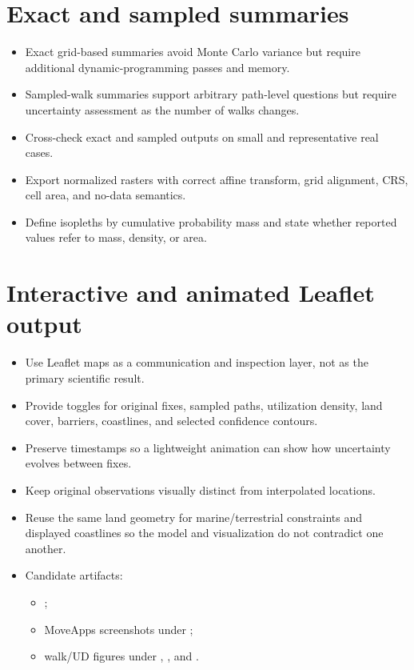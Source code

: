 \section{Exact and sampled summaries}

\begin{itemize}
  \item Exact grid-based summaries avoid Monte Carlo variance but require additional dynamic-programming passes and memory.
  \item Sampled-walk summaries support arbitrary path-level questions but require uncertainty assessment as the number of walks changes.
  \item Cross-check exact and sampled outputs on small and representative real cases.
  \item Export normalized rasters with correct affine transform, grid alignment, CRS, cell area, and no-data semantics.
  \item Define isopleths by cumulative probability mass and state whether reported values refer to mass, density, or area.
\end{itemize}

\section{Interactive and animated Leaflet output}

\begin{itemize}
  \item Use Leaflet maps as a communication and inspection layer, not as the primary scientific result.
  \item Provide toggles for original fixes, sampled paths, utilization density, land cover, barriers, coastlines, and selected confidence contours.
  \item Preserve timestamps so a lightweight animation can show how uncertainty evolves between fixes.
  \item Keep original observations visually distinct from interpolated locations.
  \item Reuse the same land geometry for marine/terrestrial constraints and displayed coastlines so the model and visualization do not contradict one another.
  \item Candidate artifacts:
  \begin{itemize}
    \item {};
    \item MoveApps screenshots under ;
    \item walk/UD figures under , , and .
  \end{itemize}
\end{itemize}


